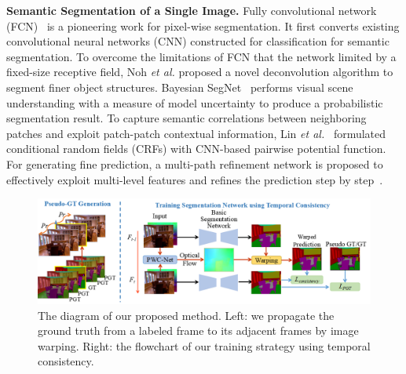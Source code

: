 \noindent \textbf{Semantic Segmentation of a Single Image.}
%
Fully convolutional network (FCN)~\cite{Long2015} is a pioneering work for pixel-wise segmentation. It first converts existing convolutional neural networks (CNN) constructed for classification for semantic segmentation.
%
To overcome the limitations of FCN that the network limited by a fixed-size receptive field, Noh \emph{et al.} \cite{Noh2015} proposed a novel deconvolution algorithm to segment finer object structures.
%
Bayesian SegNet~\cite{Kendall2015} performs visual scene understanding with a measure of model uncertainty to produce a probabilistic segmentation result.
%
To capture semantic correlations between neighboring patches and exploit patch-patch contextual information, Lin \emph{et al.}~\cite{Lin2016} formulated conditional random fields (CRFs) with CNN-based pairwise potential function. 
%
For generating fine prediction, a multi-path refinement network is proposed to effectively exploit multi-level features and refines the prediction step by step~\cite{Lin2017}.
%


\begin{figure}[htbp]
	\setlength{\abovecaptionskip}{0pt} 
	\setlength{\belowcaptionskip}{10pt}
	\centering
	\centering
	\includegraphics[scale=0.57]{figure/Pipeline.png}
	\caption{The diagram of our proposed method. Left: we propagate the ground truth from a labeled frame to its adjacent frames by image warping. Right: the flowchart of our training strategy using temporal consistency. 
		}
	\label{fig:Pipeline}
	\vspace*{-0.2cm}
\end{figure}
 

